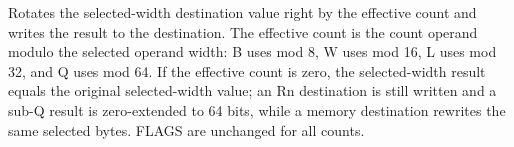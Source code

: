 Rotates the selected-width destination value right by the effective count and writes the result to the destination. The effective count is the count operand modulo the selected operand width: B uses mod 8, W uses mod 16, L uses mod 32, and Q uses mod 64. If the effective count is zero, the selected-width result equals the original selected-width value; an Rn destination is still written and a sub-Q result is zero-extended to 64 bits, while a memory destination rewrites the same selected bytes. FLAGS are unchanged for all counts.
